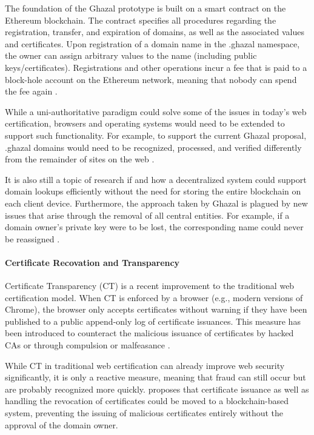 The foundation of the Ghazal prototype is built on a smart contract on the Ethereum blockchain. The contract specifies all procedures regarding the registration, transfer, and expiration of domains, as well as the associated values and certificates. Upon registration of a domain name in the .ghazal namespace, the owner can assign arbitrary values to the name (including public keys/certificates). Registrations and other operations incur a fee that is paid to a block-hole account on the Ethereum network, meaning that nobody can spend the fee again \cite{zohar_ghazal:_2019}.

While a uni-authoritative paradigm could solve some of the issues in today's web certification, browsers and operating systems would need to be extended to support such functionality. For example, to support the current Ghazal proposal, .ghazal domains would need to be recognized, processed, and verified differently from the remainder of sites on the web \cite{zohar_ghazal:_2019}.

It is also still a topic of research if and how a decentralized system could support domain lookups efficiently without the need for storing the entire blockchain on each client device. Furthermore, the approach taken by Ghazal is plagued by new issues that arise through the removal of all central entities. For example, if a domain owner's private key were to be lost, the corresponding name could never be reassigned \cite{zohar_ghazal:_2019}.

\paragraph{Certificate Recovation and Transparency}

Certificate Transparency (CT) is a recent improvement to the traditional web certification model. When CT is enforced by a browser (e.g., modern versions of Chrome), the browser only accepts certificates without warning if they have been published to a public append-only log of certificate issuances. This measure has been introduced to counteract the malicious issuance of certificates by hacked CAs or through compulsion or malfeasance \cite{zohar_blockchain-based_2019}.

While CT in traditional web certification can already improve web security significantly, it is only a reactive measure, meaning that fraud can still occur but are probably recognized more quickly. \cite{zohar_blockchain-based_2019} proposes that certificate issuance as well as handling the revocation of certificates could be moved to a blockchain-based system, preventing the issuing of malicious certificates entirely without the approval of the domain owner.

